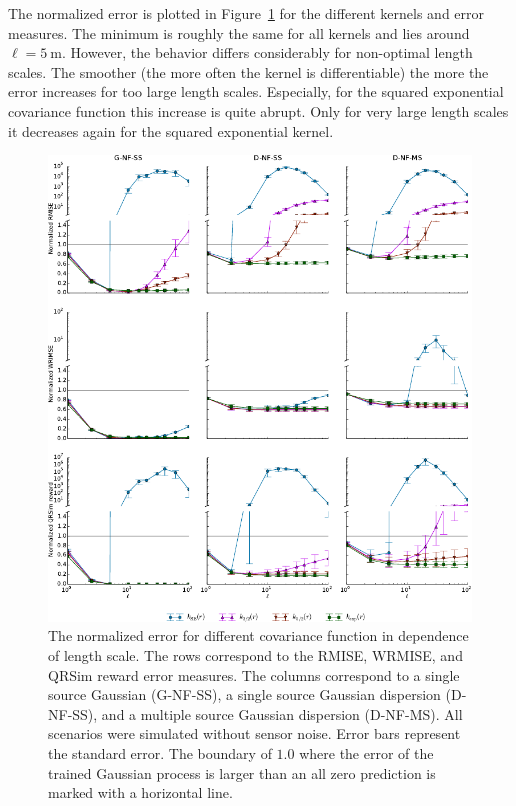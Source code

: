 The normalized error is plotted in Figure~\ref{fig:lengthscales} for the 
different kernels and error measures. The minimum is roughly the same for all 
kernels and lies around $\ell = \SI{5}{\meter}$.  However, the behavior differs 
considerably for non-optimal length scales.  The smoother (the more often the 
kernel is differentiable) the more the error increases for too large length 
scales.  Especially, for the squared exponential covariance function this 
increase is quite abrupt. Only for very large length scales it decreases again 
for the squared exponential kernel.

\begin{figure}
    \centering
    \includegraphics{plots/lengthscales}
    \caption[Influence of the length scale of the covariance functions]{The 
        normalized error for different covariance function in dependence of 
        length scale.  The rows correspond to the RMISE, WRMISE, and QRSim 
        reward error measures.  The columns correspond to a single source 
        Gaussian (G-NF-SS), a single source Gaussian dispersion (D-NF-SS), and 
        a multiple source Gaussian dispersion (D-NF-MS). All scenarios were 
        simulated without sensor noise.  Error bars represent the standard 
        error. The boundary of $1.0$ where the error of the trained Gaussian 
        process is larger than an all zero prediction is marked with 
        a horizontal line.}\label{fig:lengthscales}
\end{figure}

